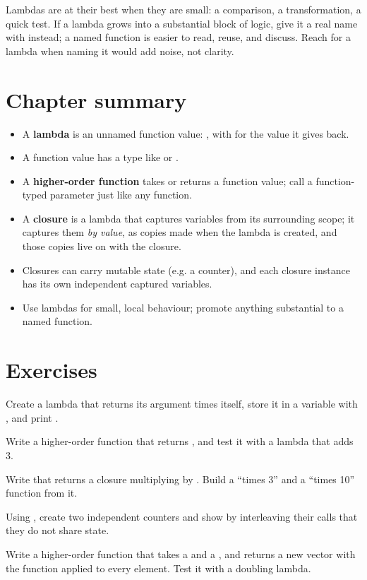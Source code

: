 \begin{tip}
Lambdas are at their best when they are small: a comparison, a transformation, a
quick test. If a lambda grows into a substantial block of logic, give it a real
name with  instead; a named function is easier to read, reuse, and
discuss. Reach for a lambda when naming it would add noise, not clarity.
\end{tip}

\section{Chapter summary}

\begin{itemize}[leftmargin=1.4em]
  \item A \textbf{lambda} is an unnamed function value:
        , with  for the value it gives
        back.
  \item A function value has a type like  or .
  \item A \textbf{higher-order function} takes or returns a function value; call a
        function-typed parameter just like any function.
  \item A \textbf{closure} is a lambda that captures variables from its
        surrounding scope; it captures them \emph{by value}, as copies made
        when the lambda is created, and those copies live on with the closure.
  \item Closures can carry mutable state (e.g. a counter), and each closure
        instance has its own independent captured variables.
  \item Use lambdas for small, local behaviour; promote anything substantial to a
        named function.
\end{itemize}

\section{Exercises}

\exercise Create a lambda  that returns its argument times itself,
store it in a variable with \code{:=}, and print .

\exercise Write a higher-order function  that returns , and test it with a lambda that adds 3.

\exercise Write  that returns a
closure multiplying by . Build a ``times 3'' and a ``times 10''
function from it.

\exercise Using , create two independent counters and show by
interleaving their calls that they do not share state.

\exercise Write a higher-order function  that takes a
 and a , and returns a new vector with the
function applied to every element. Test it with a doubling lambda.
